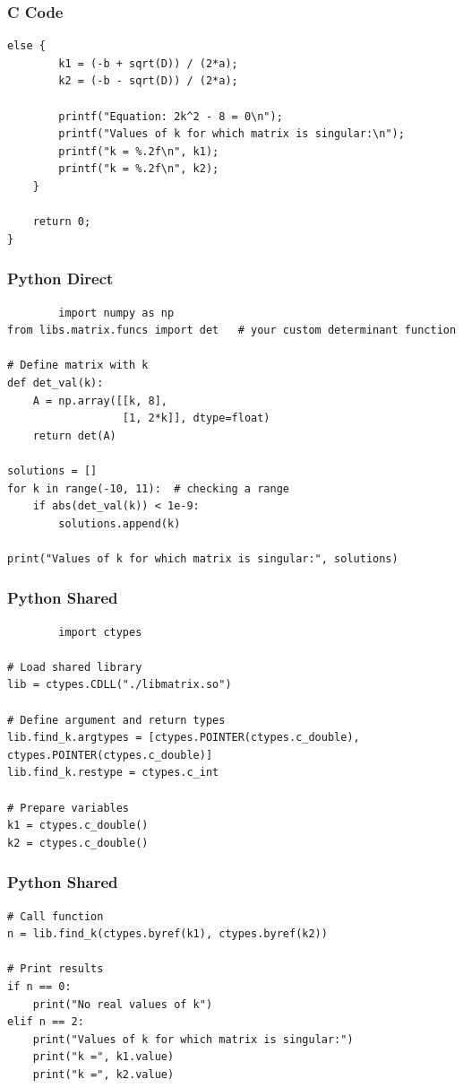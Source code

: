 \documentclass{beamer}
\begin{document}
\begin{frame}[fragile]
    \frametitle{C Code}
    \begin{lstlisting}else {
        k1 = (-b + sqrt(D)) / (2*a);
        k2 = (-b - sqrt(D)) / (2*a);

        printf("Equation: 2k^2 - 8 = 0\n");
        printf("Values of k for which matrix is singular:\n");
        printf("k = %.2f\n", k1);
        printf("k = %.2f\n", k2);
    }

    return 0;
}

    \end{lstlisting}
\end{frame}
\begin{frame}[fragile]
    \frametitle{Python Direct}
    \begin{lstlisting}
        import numpy as np
from libs.matrix.funcs import det   # your custom determinant function

# Define matrix with k
def det_val(k):
    A = np.array([[k, 8],
                  [1, 2*k]], dtype=float)
    return det(A)

solutions = []
for k in range(-10, 11):  # checking a range
    if abs(det_val(k)) < 1e-9:
        solutions.append(k)

print("Values of k for which matrix is singular:", solutions)

    \end{lstlisting}
\end{frame}
\begin{frame}[fragile]
    \frametitle{Python Shared}
    \begin{lstlisting}
        import ctypes

# Load shared library
lib = ctypes.CDLL("./libmatrix.so")

# Define argument and return types
lib.find_k.argtypes = [ctypes.POINTER(ctypes.c_double), ctypes.POINTER(ctypes.c_double)]
lib.find_k.restype = ctypes.c_int

# Prepare variables
k1 = ctypes.c_double()
k2 = ctypes.c_double()
  \end{lstlisting}
\end{frame}
\begin{frame}[fragile]
    \frametitle{Python Shared}
    \begin{lstlisting}
# Call function
n = lib.find_k(ctypes.byref(k1), ctypes.byref(k2))

# Print results
if n == 0:
    print("No real values of k")
elif n == 2:
    print("Values of k for which matrix is singular:")
    print("k =", k1.value)
    print("k =", k2.value)

    \end{lstlisting}
\end{frame}
\end{document}
